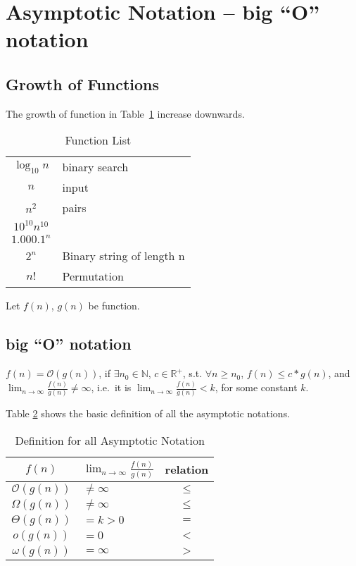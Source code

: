 
\section{Asymptotic Notation -- big ``O'' notation}

\subsection{Growth of Functions}

The growth of function in Table~\ref{function_list} increase downwards.
\begin{table}[H]
\centering
\caption{Function List}\label{function_list}
\begin{tabular}{c|l}
$\log_{10} n$ & binary search \\
$n$ & input \\
$n^2$ & pairs \\
$10^{10}n^{10}$ & \\
$1.000.1^n$ & \\
$2^n$ & Binary string of length n \\
$n!$ & Permutation \\
\end{tabular}
\end{table}
Let $f(n)$, $g(n)$ be function.

\subsection{big ``O'' notation}
\begin{definition}

$f(n) = \mathcal{O}(g(n))$, if $\exists n_0 \in \mathbb{N}$,
$c \in \mathbb{R}^+$, s.t. $\forall n \geq n_0$, $f(n) \leq c * g(n)$,
and $\lim_{n \rightarrow \infty} \frac{f(n)}{g(n)} \ne \infty$, i.e.\ it is $\lim_{n \rightarrow \infty} \frac{f(n)}{g(n)} < k$, for some constant $k$.
\end{definition}

Table \ref{def_asymptotic_notation} shows the basic definition of all the asymptotic notations.
\begin{table}[H]
\centering
\caption{Definition for all Asymptotic Notation}\label{def_asymptotic_notation}
\begin{tabular}{c|l|c}

\hline
$f(n)$ & $\lim_{n \rightarrow \infty} \frac{f(n)}{g(n)}$ & relation \\
\hline
\hline
$\mathcal{O}(g(n))$ & $\neq \infty$ & $\leq$ \\
$\Omega(g(n))$  & $\neq \infty$ & $\leq$  \\
$\Theta(g(n))$  & $= k > 0$ & $=$  \\
$o(g(n))$  & $= 0$ & $<$  \\
$\omega(g(n))$  & $= \infty$ & $>$  \\
\end{tabular}
\end{table}

